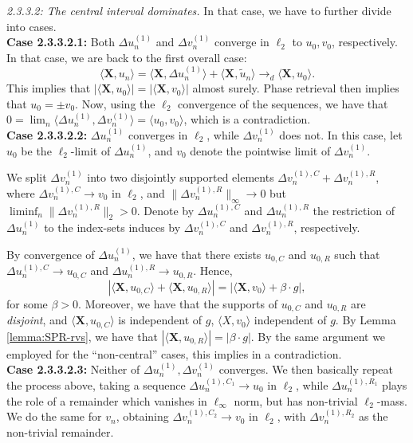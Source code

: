 \documentclass[a4paper,12pt]{amsart}
\numberwithin{equation}{section}
\newcommand{\X}{\mathbf X}
\begin{document}
\noindent\textit{2.3.3.2: The central interval dominates.}  In that case, we have to further divide into cases. \\

 \noindent \textbf{Case 2.3.3.2.1:} Both $\Delta u_n^{(1)}$ and $\Delta v_n^{(1)}$ converge in $\ell_2$ to $u_0,v_0$, respectively. In that case, we are back to the first overall case: 
 \[
 \langle \X, u_n \rangle = \langle \X, \Delta u_n^{(1)} \rangle + \langle \X, \tilde{u}_n\rangle \to_d \langle \X, u_0\rangle. 
 \]
This implies that $|\langle \X, u_0 \rangle| = |\langle \X,v_0 \rangle|$ almost surely. Phase retrieval then implies that $u_0 = \pm v_0$. Now, using the $\ell_2$ convergence of the sequences, we have that $0 = \lim_n \langle \Delta u_n^{(1)}, \Delta v_n^{(1)} \rangle = \langle u_0,v_0\rangle$, which is a contradiction. \\

\noindent\textbf{Case 2.3.3.2.2:} $\Delta u_n^{(1)}$ converges in $\ell_2$, while $\Delta v_n^{(1)}$ does not. In this case, let $u_0$ be the $\ell_2$-limit of $\Delta u_n^{(1)}$, and $v_0$ denote the pointwise limit of $\Delta v_n^{(1)}$. 

We split $\Delta v_n^{(1)}$ into two disjointly supported elements $\Delta v_n^{(1),C} + \Delta v_n^{(1),R}$, where $\Delta v_n^{(1),C} \to v_0$ in $\ell_2$, and $\|\Delta v_n^{(1),R}\|_{\infty} \to 0$ but $\liminf_n \| \Delta v_n^{(1),R}\|_2>0$. Denote by $\Delta u_n^{(1),C}$ and $\Delta u_n^{(1),R}$ the restriction of $\Delta u_n^{(1)}$ to the index-sets induces by $\Delta v_n^{(1),C}$ and $\Delta v_n^{(1),R}$, respectively. 

By convergence of $\Delta u_n^{(1)}$, we have that there exists $u_{0,C}$ and $u_{0,R}$ such that $\Delta u_n^{(1),C} \to u_{0,C}$ and $\Delta u_n^{(1),R} \to u_{0,R}$. Hence, 
\[
|\langle \X, u_{0,C} \rangle + \langle \X, u_{0,R} \rangle| = |\langle \X, v_0 \rangle + \beta \cdot g|,
\]
for some $\beta > 0$. Moreover, we have that the supports of $u_{0,C}$ and $u_{0,R}$ are \emph{disjoint}, and $\langle \X, u_{0,C} \rangle$ is independent of $g$, $\langle X,v_0 \rangle$ independent of $g$. By Lemma \ref{lemma:SPR-rvs}, we have that $|\langle \X,u_{0,R} \rangle| = | \beta \cdot g|$. By the same argument we employed for the ``non-central'' cases, this implies in a contradiction. \\

\noindent\textbf{Case 2.3.3.2.3:} Neither of $\Delta u_n^{(1)}, \Delta v_n^{(1)}$ converges. We then basically repeat the process above, taking a sequence $\Delta u_n^{(1),C_1} \to u_0$ in $\ell_2$, while $\Delta u_n^{(1),R_1}$ plays the role of a remainder which vanishes in $\ell_{\infty}$ norm, but has non-trivial $\ell_2$-mass. We do the same for $v_n$, obtaining $\Delta v_n^{(1),C_2} \to v_0$ in $\ell_2$, with $\Delta v_n^{(1),R_2}$ as the non-trivial remainder. \\
\end{document}
